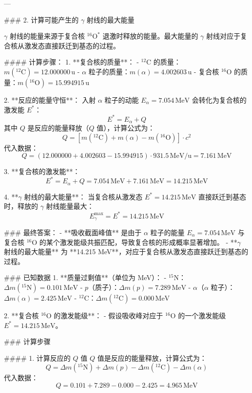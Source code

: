 \documentclass{article}
\begin{document}
\begin{enumerate}
---

### 2. 计算可能产生的 \(\gamma\) 射线的最大能量

\(\gamma\) 射线的能量来源于复合核 \(^{16}\text{O}^*\) 退激时释放的能量。最大能量的 \(\gamma\) 射线对应于复合核从激发态直接跃迁到基态的过程。

#### 计算步骤：
1. **复合核的质量**：
   - \(^{12}\text{C}\) 的质量：\(m(^{12}\text{C}) = 12.000000 \, \text{u}\)
   - \(\alpha\) 粒子的质量：\(m(\alpha) = 4.002603 \, \text{u}\)
   - 复合核 \(^{16}\text{O}\) 的质量：\(m(^{16}\text{O}) = 15.994915 \, \text{u}\)

2. **反应的能量守恒**：
   入射 \(\alpha\) 粒子的动能 \(E_\alpha = 7.054 \, \text{MeV}\) 会转化为复合核的激发能 \(E^*\)：
   \[
   E^* = E_\alpha + Q
   \]
   其中 \(Q\) 是反应的能量释放（\(Q\) 值），计算公式为：
   \[
   Q = [m(^{12}\text{C}) + m(\alpha) - m(^{16}\text{O})] \cdot c^2
   \]
   代入数据：
   \[
   Q = (12.000000 + 4.002603 - 15.994915) \cdot 931.5 \, \text{MeV/u} = 7.161 \, \text{MeV}
   \]

3. **复合核的激发能**：
   \[
   E^* = E_\alpha + Q = 7.054 \, \text{MeV} + 7.161 \, \text{MeV} = 14.215 \, \text{MeV}
   \]

4. **\(\gamma\) 射线的最大能量**：
   当复合核从激发态 \(E^* = 14.215 \, \text{MeV}\) 直接跃迁到基态时，释放的 \(\gamma\) 射线能量最大：
   \[
   E_\gamma^\text{max} = E^* = 14.215 \, \text{MeV}
   \]


### 最终答案：
- **吸收截面峰值** 是由于 \(\alpha\) 粒子的能量 \(E_\alpha = 7.054 \, \text{MeV}\) 与复合核 \(^{16}\text{O}\) 的某个激发能级共振匹配，导致复合核的形成概率显著增加。
- **\(\gamma\) 射线的最大能量** 为 **14.215 MeV**，对应于复合核从激发态直接跃迁到基态的过程。


### 已知数据
1. **质量过剩值**（单位为 MeV）：
   - \(^{15}\text{N}\)：\(\Delta m(^{15}\text{N}) = 0.101 \, \text{MeV}\)
   - \(p\)（质子）：\(\Delta m(p) = 7.289 \, \text{MeV}\)
   - \(\alpha\)（\(\alpha\) 粒子）：\(\Delta m(\alpha) = 2.425 \, \text{MeV}\)
   - \(^{12}\text{C}\)：\(\Delta m(^{12}\text{C}) = 0.000 \, \text{MeV}\)

2. **复合核 \(^{16}\text{O}\) 的激发能级**：
   - 假设吸收峰对应于 \(^{16}\text{O}\) 的一个激发能级 \(E^* = 14.215 \, \text{MeV}\)。


### 计算步骤

#### 1. 计算反应的 \(Q\) 值
\(Q\) 值是反应的能量释放，计算公式为：
\[
Q = \Delta m(^{15}\text{N}) + \Delta m(p) - \Delta m(^{12}\text{C}) - \Delta m(\alpha)
\]
代入数据：
\[
Q = 0.101 + 7.289 - 0.000 - 2.425 = 4.965 \, \text{MeV}
\]


\end{enumerate}
\end{document}
